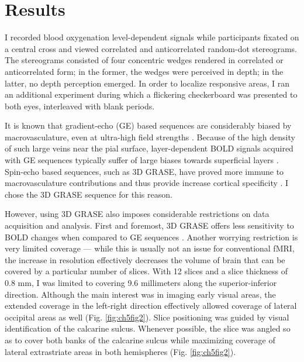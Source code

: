 \section{Results}
I recorded blood oxygenation level-dependent signals while participants fixated on a central cross and viewed correlated and anticorrelated random-dot stereograms. The stereograms consisted of four concentric wedges rendered in correlated  or anticorrelated form; in the former, the wedges were perceived in depth; in the latter, no depth perception emerged. In order to localize responsive areas, I ran an additional experiment during which a flickering checkerboard was presented to both eyes, interleaved with blank periods.

It is known that gradient-echo (GE) based sequences are considerably biased by macrovasculature, even at ultra-high field strengths \cite{DeMartino:2013qy}. Because of the high density of such large veins near the pial surface, layer-dependent BOLD signals acquired with GE sequences typically suffer of large biases towards superficial layers \cite{Polimeni:2010fl,Koopmans:2010hq}. Spin-echo based sequences, such as 3D GRASE, have proved more immune to macrovasculature contributions and thus provide increase cortical specificity \cite{DeMartino:2013qy}. I chose the 3D GRASE sequence for this reason.

However, using 3D GRASE also imposes considerable restrictions on data acquisition and analysis. First and foremost, 3D GRASE offers less sensitivity to BOLD changes when compared to GE sequences \cite{DeMartino:2013qy}. Another worrying restriction is very limited coverage --- while this is usually not an issue for conventional fMRI, the increase in resolution effectively decreases the volume of brain that can be covered by a particular number of slices. With 12 slices and a slice thickness of 0.8 mm, I was limited to covering 9.6 millimeters along the superior-inferior direction. Although the main interest was in imaging early visual areas, the extended coverage in the left-right direction effectively allowed coverage of lateral occipital areas as well (Fig. \ref{fig:ch5fig2}). Slice positioning was guided by visual identification of the calcarine sulcus. Whenever possible, the slice was angled so as to cover both banks of the calcarine sulcus while maximizing coverage of lateral extrastriate areas in both hemispheres (Fig. \ref{fig:ch5fig2}).

